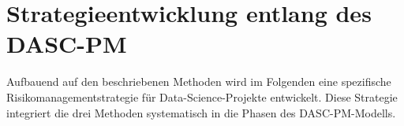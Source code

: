 \chapter{Strategieentwicklung entlang des DASC-PM} \label{sec:strategie}

Aufbauend auf den beschriebenen Methoden wird im Folgenden eine spezifische Risikomanagementstrategie für Data-Science-Projekte entwickelt.
Diese Strategie integriert die drei Methoden systematisch in die Phasen des DASC-PM-Modells.




